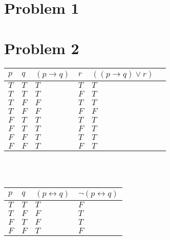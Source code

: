 \documentclass{article}%
\begin{document}
\section*{Problem 1}


\section*{Problem 2}


\begin{tabular}{l | l | l | l | l | l}
    $p$ & $q$ & $(p \rightarrow q)$ & $r$ & $((p \rightarrow q) \vee r)$ \\ \hline
    $T$ & $T$ & $T$                 & $T$ & $T$ \\ \hline
    $T$ & $T$ & $T$                 & $F$ & $T$ \\ \hline
    $T$ & $F$ & $F$                 & $T$ & $T$ \\ \hline
    $T$ & $F$ & $F$                 & $F$ & $F$ \\ \hline
    $F$ & $T$ & $T$                 & $T$ & $T$ \\ \hline
    $F$ & $T$ & $T$                 & $F$ & $T$ \\ \hline
    $F$ & $F$ & $T$                 & $T$ & $T$ \\ \hline
    $F$ & $F$ & $T$                 & $F$ & $T$ \\
    \hline
\end{tabular}\\
\\
\vspace{4mm}
\begin{tabular}{l | l | l | l |}
    $p$ & $q$ & $(p \leftrightarrow q)$ & $\neg (p \leftrightarrow q)$ \\ \hline
    $T$ & $T$ & $T$                     & $F$ \\ \hline
    $T$ & $F$ & $F$                     & $T$ \\ \hline
    $F$ & $T$ & $F$                     & $T$ \\ \hline
    $F$ & $F$ & $T$                     & $F$ \\
    \hline
\end{tabular}\\
\\
\vspace{4mm}
\end{document}
